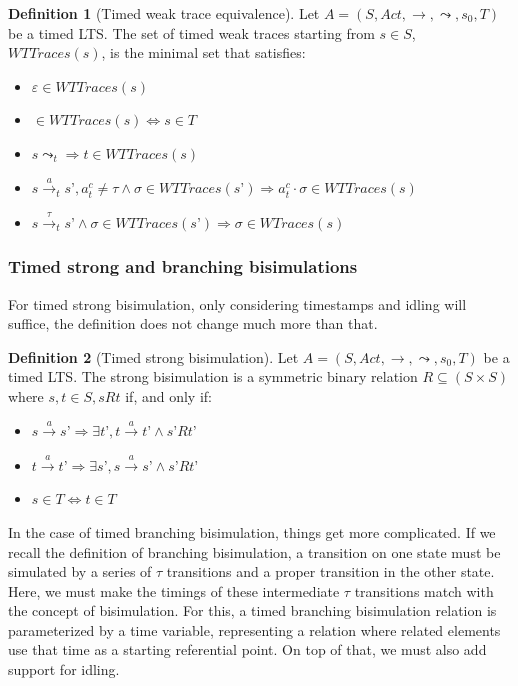 \documentclass[11pt]{article}
\theoremstyle{definition}
\newtheorem{definition}{Definition}
\newcommand{\cmark}{\ding{51}}
\theoremstyle{plain}
\theoremstyle{definition}
\begin{document}
\begin{definition} [Timed weak trace equivalence]
	Let $ A = (S, Act, \rightarrow, \leadsto, s_0, T) $ be a timed LTS. The set of timed weak traces starting from $ s \in S$, $ WTTraces(s) $, is the minimal set that satisfies:
	\begin{itemize}
		\item $ \varepsilon \in WTTraces(s) $
		\item \cmark $ \in WTTraces(s) \iff s \in T $
		\item $ s\leadsto_t \Rightarrow t \in WTTraces(s) $
		\item $ s\xrightarrow{a}_t s’, a^c_t\not = \tau \wedge \sigma \in WTTraces(s’) \Rightarrow a^c_t\cdot\sigma \in WTTraces(s) $
		\item $ s\xrightarrow{\tau}_t s’ \wedge \sigma \in WTTraces(s’) \Rightarrow \sigma \in WTraces(s) $
	\end{itemize}
\end{definition}

\subsubsection{Timed strong and branching bisimulations}

For timed strong bisimulation, only considering timestamps and idling will suffice, the definition does not change much more than that.

\begin{definition} [Timed strong bisimulation]
	Let $ A = (S, Act, \rightarrow, \leadsto, s_0, T) $ be a timed LTS. The strong bisimulation is a symmetric binary relation $ R  \subseteq (S\times S) $ where $ s, t \in S, s R t $ if, and only if:
	\begin{itemize}
		\item $ s\xrightarrow{a}s’ \Rightarrow \exists t’, t\xrightarrow{a}t’ \wedge s’ R t’ $
		\item $ t\xrightarrow{a}t’ \Rightarrow \exists s’, s\xrightarrow{a}s’ \wedge s’ R t’ $
		\item $ s \in T \iff t \in T $
	\end{itemize}
	
\end{definition}

In the case of timed branching bisimulation, things get more complicated. If we recall the definition of branching bisimulation, a transition on one state must be simulated by a series of $ \tau $ transitions and a proper transition in the other state. Here, we must make the timings of these intermediate $ \tau $ transitions match with the concept of bisimulation. For this, a timed branching bisimulation relation is parameterized by a time variable, representing a relation where related elements use that time as a starting referential point. On top of that, we must also add support for idling.
\end{document}
